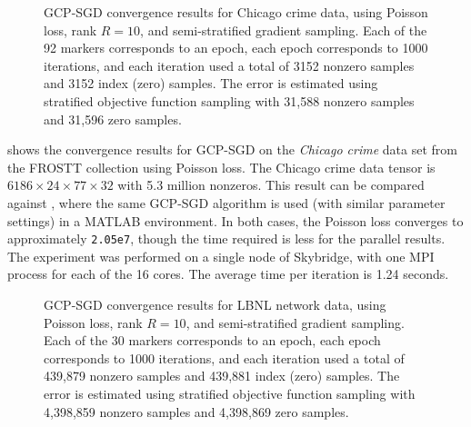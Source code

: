 \begin{figure}
\renewcommand{\datafile}{data/convergence/chicago_conv.dat}
\centering
{}
\caption[GCP-SGD convergence for \emph{Chicago crime data} tensor]{GCP-SGD convergence results for Chicago crime data, using Poisson loss, rank $R=10$, and semi-stratified gradient sampling.  Each of the 92 markers corresponds to an epoch, each epoch corresponds to 1000 iterations, and each iteration used a total of 3152 nonzero samples and 3152 index (zero) samples.  The error is estimated using stratified objective function sampling with 31{,}588 nonzero samples and 31{,}596 zero samples.}
\label{fig:chicago_conv}
\end{figure}

 shows the convergence results for GCP-SGD on the \emph{Chicago crime} data set from the FROSTT \cite{FROSTT} collection using Poisson loss.
The Chicago crime data tensor is $6186\times 24\times 77\times 32$ with 5.3 million nonzeros.
This result can be compared against \cite[Figure 5.6]{KH19}, where the same GCP-SGD algorithm is used (with similar parameter settings) in a MATLAB environment.
In both cases, the Poisson loss converges to approximately \texttt{2.05e7}, though the time required is less for the parallel results.
The experiment was performed on a single node of Skybridge, with one MPI process for each of the 16 cores.
The average time per iteration is 1.24 seconds.

\begin{figure}
\renewcommand{\datafile}{data/convergence/lbnl_conv.dat}
\centering
{}
\caption[GCP-SGD convergence for \emph{LBNL network} tensor]{GCP-SGD convergence results for LBNL network data, using Poisson loss, rank $R=10$, and semi-stratified gradient sampling.  Each of the 30 markers corresponds to an epoch, each epoch corresponds to 1000 iterations, and each iteration used a total of 439{,}879 nonzero samples and 439{,}881 index (zero) samples.  The error is estimated using stratified objective function sampling with 4{,}398{,}859 nonzero samples and 4{,}398{,}869 zero samples.}
\label{fig:lbnl_conv}
\end{figure}

